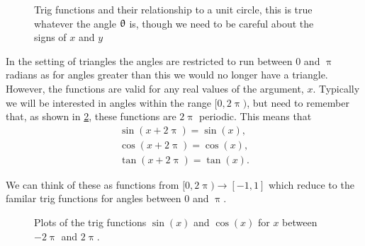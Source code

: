 \begin{figure}[ht]
    \centering
{}
    \caption{Trig functions and their relationship to a unit circle, this is true whatever the angle $\uptheta$ is, though we need to be careful about the signs of $x$ and $y$ }
        \label{fig:trig and circles}
\end{figure}


In the setting of triangles the angles are restricted to run between $0$ and $\uppi$ radians as for angles greater than this we would no longer have a triangle. However, the functions are valid for any real values of the argument, $x$. Typically we will be interested in angles within the range $[0,2\uppi)$, but need to remember that, as shown in \cref{fig: trig functions}, these functions are $2\uppi$ periodic. This means that
\begin{align*}
\sin(x+2\uppi)=\sin(x),\\
\cos(x+2\uppi)=\cos(x),\\
\tan(x+2\uppi)=\tan(x).
\end{align*}

We can think of these as functions from $[0,2\uppi)\to [-1,1]$ which reduce to the familar trig functions for angles between $0$ and $\uppi$.\\

\begin{figure}[ht]
    \centering
{}
    \caption{Plots of the trig functions $\sin(x)$ and $\cos(x)$ for $x$ between $-2\uppi$ and $2\uppi$.}
        \label{fig: trig functions}
\end{figure}


